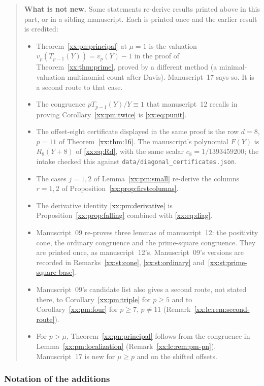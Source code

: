 \documentclass[11pt,a4paper]{article}
\numberwithin{equation}{section}
\theoremstyle{definition}
\theoremstyle{remark}
\theoremstyle{plain}
\begin{document}
\begin{quote}
\smallskip
\textbf{What is not new.}  Some statements re-derive results printed above in
this part, or in a sibling manuscript.  Each is printed once and the earlier
result is credited:
\begin{itemize}[leftmargin=1.4em,itemsep=1pt]
\item Theorem~\ref{xx:pn:principal} at $\mu=1$ is the valuation
 $v_p(T_{p-1}(Y))=v_p(Y)-1$ in the proof of Theorem~\ref{xx:thm:prime}, proved
 by a different method (a minimal-valuation multinomial count after Davis).
 Manuscript~17 says so.  It is a second route to that case.
\item The congruence $pT_{p-1}(Y)/Y\equiv1$ that manuscript~12 recalls in
 proving Corollary~\ref{xx:pm:twice} is \eqref{xx:eq:punit}.
\item The offset-eight certificate displayed in the same proof is the row
 $d=8$, $p=11$ of Theorem~\ref{xx:thm:16}.  The manuscript's polynomial $F(Y)$
 is $R_8(Y+8)$ of \eqref{xx:eq:Rd}, with the same scalar
 $c_8=1/1393459200$; the intake checked this against
 \texttt{data/diagonal\_certificates.json}.
\item The cases $j=1,2$ of Lemma~\ref{xx:pm:small} re-derive the columns $r=1,2$
 of Proposition~\ref{xx:prop:firstcolumns}.
\item The derivative identity \eqref{xx:pm:derivative} is
 Proposition~\ref{xx:prop:falling} combined with \eqref{xx:eq:diag}.
\item Manuscript~09 re-proves three lemmas of manuscript~12: the positivity cone,
 the ordinary congruence and the prime-square congruence.  They are printed
 once, as manuscript~12's.  Manuscript~09's versions are recorded in
 Remarks~\ref{xx:st:cone}, \ref{xx:st:ordinary}
 and~\ref{xx:st:prime-square-base}.
\item Manuscript~09's candidate list also gives a second route, not stated
 there, to Corollary~\ref{xx:pm:triple} for $p\ge5$ and to
 Corollary~\ref{xx:pm:four} for $p\ge7$, $p\ne11$
 (Remark~\ref{xx:lc:rem:second-route}).
\item For $p>\mu$, Theorem~\ref{xx:pn:principal} follows from the congruence in
 Lemma~\ref{xx:pm:localization} (Remark~\ref{xx:lc:rem:pm-pn}).  Manuscript~17
 is new for $\mu\ge p$ and on the shifted offsets.
\end{itemize}
\end{quote}

\subsubsection{Notation of the additions}\label{xx:lc:sec:notation}
\end{document}

